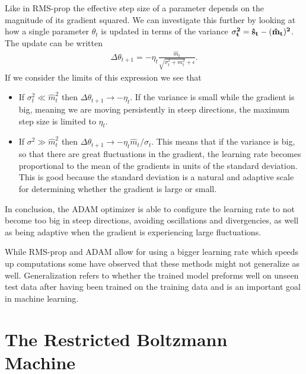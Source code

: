 \documentclass[twoside,english]{uiofysmaster}
\begin{document}
Like in RMS-prop the effective step size of a parameter depends on the magnitude of its gradient squared. 
We can investigate this further by looking at how a single parameter $\theta_t$ is updated in terms of the variance $\bf{\sigma}_t^2 = \hat{\mathbf{s}}_t  - (\hat{\mathbf{m}}_t)^2$. The update can be written
\begin{align}
	\Delta \theta_{t+1} = -\eta_t \frac{\hat{m}_t}{\sqrt{\sigma_t^2 + m_t^2} + \epsilon} .
\end{align}
If we consider the limits of this expression we see that
\begin{itemize}
	\item  If $\sigma_t^2 \ll  \hat{m}_t^2$ then  $\Delta \theta_{t+1} \rightarrow -\eta_t$. If the variance is small while the gradient is big, meaning we are moving persistently in steep directions, the maximum step size is limited to $\eta_t$.
	\item If  $\sigma^2 \gg \hat{m}_t^2$ then $\Delta \theta_{t+1} \rightarrow -\eta_t \hat{m}_t/ \sigma_t$. This means that if the variance is big, so that there are great fluctuations in the gradient, the learning rate becomes proportional to the mean of the gradients in units of the standard deviation. This is good because the standard deviation is a natural and adaptive scale for determining whether the gradient is large or small.
\end{itemize}
In conclusion, the ADAM optimizer is able to configure the learning rate to not become too big in steep directions, avoiding oscillations and divergencies, as well as being adaptive when the gradient is experiencing large fluctuations. 

While RMS-prop and ADAM allow for using a bigger learning rate which speeds up computations some have observed that these methods might not generalize as well. Generalization refers to whether the trained model preforms well on unseen test data after having been trained on the training data and is an important goal in machine learning. 











\chapter{The Restricted Boltzmann Machine}
\label{sec:RBMchapter}
\end{document}
